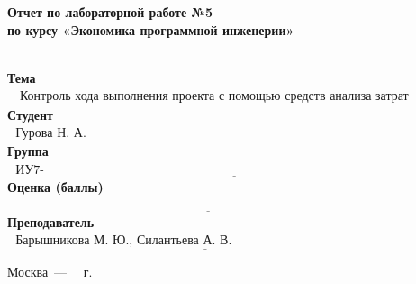 \begin{titlepage}
	
	\begin{center}
		\Large\textbf{Отчет по лабораторной работе №5}\\
		\Large\textbf{по курсу «Экономика программной инженерии»}\\
		~\\
	\end{center}
	
	\noindent\textbf{Тема} $\underline{\text{~~
 Контроль хода выполнения проекта с помощью средств анализа затрат~~~~~~~~~~~}}$\newline\newline
	\noindent\textbf{Студент} $\underline{\text{~~Гурова Н. А.~~~~~~~~~~~~~~~~~~~~~~~~~~~~~~~~~~~~~~~~~~~~~~~~~~~~~~~~~~~~~~~~~~~~~~~~~~~~~~~~~~~~~~~~}}$\newline\newline
	\noindent\textbf{Группа} $\underline{\text{~~ИУ7-84Б~~~~~~~~~~~~~~~~~~~~~~~~~~~~~~~~~~~~~~~~~~~~~~~~~~~~~~~~~~~~~~~~~~~~~~~~~~~~~~~~~~~~~~~~~~~~~~~}}$\newline\newline
	\noindent\textbf{Оценка (баллы)} $\underline{\text{ ~~~~~~~~~~~~~~~~~~~~~~~~~~~~~~~~~~~~~~~~~~~~~~~~~~~~~~~~~~~~~~~~~~~~~~~~~~~~~~~~~~~~~~~~~~~~~~~}}$\newline\newline
	\noindent\textbf{Преподаватель} $\underline{\text{~~Барышникова М. Ю., Силантьева А. В.~~~~~~~~~~~~~~~~~~~~~~~~~~~~~~~~~~~~~~~~~}}$\newline
	
	\begin{center}
		\vfill
		Москва~---~\the\year
		~г.
	\end{center}
	\restoregeometry
\end{titlepage}

